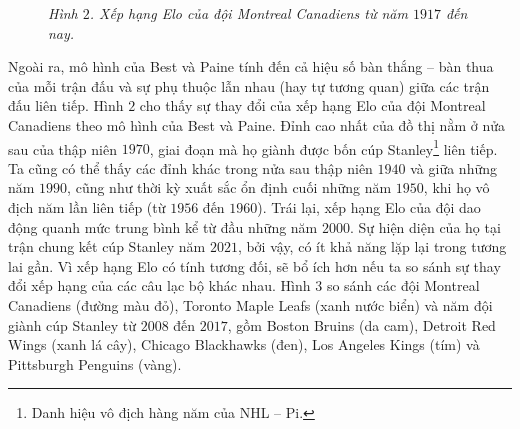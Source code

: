 \begin{multicols}{2}
\begin{figure}[H]
		\caption{\small\textit{\color{toanhocdoisong}Hình $2$. Xếp hạng Elo của đội Montreal Canadiens từ năm $1917$ đến nay.}}
		\vspace*{-10pt}
	\end{figure}
	Ngoài ra, mô hình của Best và Paine tính đến cả hiệu số bàn thắng -- bàn thua của mỗi trận đấu và sự phụ thuộc lẫn nhau (hay tự tương quan) giữa các trận đấu liên tiếp.
	\vskip 0.05cm
	Hình $2$ cho thấy sự thay đổi của xếp hạng Elo của đội Montreal Canadiens theo mô hình của Best và Paine. Đỉnh cao nhất của đồ thị nằm ở nửa sau của thập niên $1970$, giai đoạn mà họ giành được bốn cúp Stanley\footnote[5]{\color{toanhocdoisong}Danh hiệu vô địch hàng năm của NHL -- Pi.}  liên tiếp.
	\vskip 0.05cm
	Ta cũng có thể thấy các đỉnh khác trong nửa sau thập niên $1940$ và giữa những năm $1990$, cũng như thời kỳ xuất sắc ổn định cuối những năm $1950$, khi họ vô địch năm lần liên tiếp (từ $1956$ đến $1960$). Trái lại, xếp hạng Elo của đội dao động quanh mức trung bình kể từ đầu những năm $2000$. Sự hiện diện của họ tại trận chung kết cúp Stanley năm $2021$, bởi vậy, có ít khả năng lặp lại trong tương lai gần.
	\vskip 0.05cm
	Vì xếp hạng Elo có tính tương đối, sẽ bổ ích hơn nếu ta so sánh sự thay đổi xếp hạng của các câu lạc bộ khác nhau. Hình $3$ so sánh các đội Montreal Canadiens (đường màu đỏ), Toronto Maple Leafs (xanh nước biển) và năm đội giành cúp Stanley từ $2008$ đến $2017$, gồm Boston Bruins (da cam), Detroit Red Wings (xanh lá cây), Chicago Blackhawks (đen), Los Angeles Kings (tím) và Pittsburgh Penguins (vàng).
	\begin{figure}[H]
		\vspace*{-10pt}
		\centering
		\captionsetup{labelformat= empty, justification=centering}

\end{figure}
\end{multicols}
